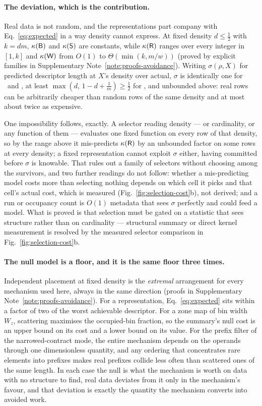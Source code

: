 \paragraph*{The deviation, which is the contribution.}
Real data is not random, and the representations part company with Eq.~\eqref{eq:expected} in a way
density cannot express. At fixed density $d\le\tfrac12$ with $k=dm$, $\kappa(\textsf{B})$ and $\kappa(\textsf{S})$
are constants, while $\kappa(\textsf{R})$ ranges over every integer in $[1,k]$ and $\kappa(\textsf{W})$ from $O(1)$
to $\Theta(\min(k,m/w))$ (proved by explicit families in Supplementary Note~\ref{note:proofs-avoidance}). Writing
$\sigma(\rho,X)$ for predicted descriptor length at $X$'s density over actual, $\sigma$ is identically
one for \rB\ and \rS, at least $\max(d,\,1-d+\tfrac{1}{m})\ge\tfrac12$ for \rR, and unbounded above:
real rows can be arbitrarily cheaper than random rows of the same density and at most about twice as
expensive.

One impossibility follows, exactly. A selector reading density --- or cardinality, or any function of
them --- evaluates one fixed function on every row of that density, so by the range above it
mis-predicts $\kappa(\textsf{R})$ by an unbounded factor on some rows at every density; a fixed representation
cannot exploit $\sigma$ either, having committed before $\sigma$ is knowable. That rules out a family
of selectors without choosing among the survivors, and two further readings do not follow: whether a
mis-predicting model costs more than selecting nothing depends on which cell it picks and that cell's
actual cost, which is measured (Fig.~\ref{fig:selection-cost}b), not derived; and a run or occupancy
count is $O(1)$ metadata that sees $\sigma$ perfectly and could feed a model. What is proved is that
selection must be gated on a statistic that sees structure rather than on cardinality --- structural
summary or direct kernel measurement is resolved by the measured selector comparison in
Fig.~\ref{fig:selection-cost}b.

\paragraph*{The null model is a floor, and it is the same floor three times.}
Independent placement at fixed density is the \emph{extremal} arrangement for every mechanism used
here, always in the same direction (proofs in Supplementary Note~\ref{note:proofs-avoidance}). For a representation,
Eq.~\eqref{eq:expected} sits within a factor of two of the worst achievable descriptor. For a zone map
of bin width $W_z$, scattering maximises the occupied-bin fraction, so the summary's null cost is an
upper bound on its cost and a lower bound on its value. For the prefix filter of the narrowed-contract
mode, the entire mechanism depends on the operands through one dimensionless quantity, and any ordering
that concentrates rare elements into prefixes makes real prefixes collide less often than scattered
ones of the same length. In each case the null is what the mechanism is worth on data with no
structure to find, real data deviates from it only in the mechanism's favour, and that deviation is
exactly the quantity the mechanism converts into avoided work.

